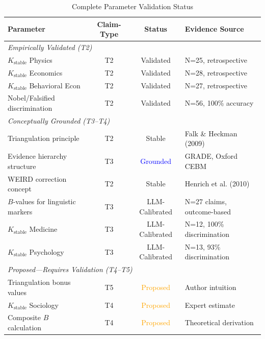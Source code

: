 \documentclass[11pt,a4paper]{article}
\begin{document}
\begin{table}[h]
\centering
\caption{Complete Parameter Validation Status}
\label{tab:param-validation}
\begin{tabular}{p{4.5cm}ccp{4cm}}
\toprule
\textbf{Parameter} & \textbf{Claim-Type} & \textbf{Status} & \textbf{Evidence Source} \\
\midrule
\multicolumn{4}{l}{\textit{Empirically Validated (T2)}} \\
$K_{\text{stable}}$ Physics & T2 & \textcolor{green!60!black}{Validated} & N=25, retrospective \\
$K_{\text{stable}}$ Economics & T2 & \textcolor{green!60!black}{Validated} & N=28, retrospective \\
$K_{\text{stable}}$ Behavioral Econ & T2 & \textcolor{green!60!black}{Validated} & N=27, retrospective \\
Nobel/Falsified discrimination & T2 & \textcolor{green!60!black}{Validated} & N=56, 100\% accuracy \\
\midrule
\multicolumn{4}{l}{\textit{Conceptually Grounded (T3--T4)}} \\
Triangulation principle & T2 & \textcolor{green!60!black}{Stable} & Falk \& Heckman (2009) \\
Evidence hierarchy structure & T3 & \textcolor{blue}{Grounded} & GRADE, Oxford CEBM \\
WEIRD correction concept & T2 & \textcolor{green!60!black}{Stable} & Henrich et al. (2010) \\
$B$-values for linguistic markers & T3 & \textcolor{green!60!black}{LLM-Calibrated} & N=27 claims, outcome-based \\
$K_{\text{stable}}$ Medicine & T3 & \textcolor{green!60!black}{LLM-Calibrated} & N=12, 100\% discrimination \\
$K_{\text{stable}}$ Psychology & T3 & \textcolor{green!60!black}{LLM-Calibrated} & N=13, 93\% discrimination \\
\midrule
\multicolumn{4}{l}{\textit{Proposed---Requires Validation (T4--T5)}} \\
Triangulation bonus values & T5 & \textcolor{orange}{Proposed} & Author intuition \\
$K_{\text{stable}}$ Sociology & T4 & \textcolor{orange}{Proposed} & Expert estimate \\
Composite $B$ calculation & T4 & \textcolor{orange}{Proposed} & Theoretical derivation \\
\bottomrule
\end{tabular}
\end{table}
\end{document}
